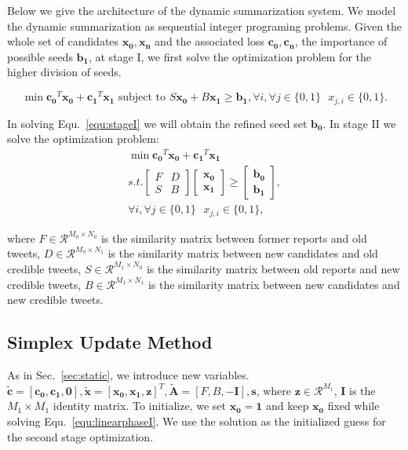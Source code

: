 \documentclass[envcountsame]{llncs}
\begin{document}
Below we give the architecture of the dynamic summarization system. We model the dynamic summarization as sequential integer programing problems.  Given the whole set of candidates $\mathbf{x_0,x_n}$ and the associated loss $\mathbf{c_0,c_n}$, the importance of possible seeds $\mathbf{b_1}$, at stage I, we first solve the optimization problem for the higher division of seeds. 

\begin{equation}\label{equ:stageI}
\min \mathbf{c_0}^T \mathbf{x_0} + \mathbf{c_1}^T \mathbf{x_1} \textrm{ subject to } S \mathbf{x_0} + B\mathbf{x_1} \geq \mathbf{b_1}, \forall i, \forall j\in \{0,1\}\textrm{ } x_{j,i}\in \{0,1\}.
\end{equation}

In solving Equ.~\ref{equ:stageI} we will obtain the refined seed set $\mathbf{b_0}$. In stage II we solve the optimization problem:
\begin{eqnarray}
\min \mathbf{c_0}^T \mathbf{x_0}+\mathbf{c_1}^T\mathbf{x_1}\\\nonumber
s.t. \begin{bmatrix}
F & D \\
S & B
\end{bmatrix}\begin{bmatrix}
 \mathbf{x_0}\\
\mathbf{x_1}
\end{bmatrix}\geq \begin{bmatrix}
\mathbf{b_0}\\
\mathbf{b_1}
\end{bmatrix},\\\nonumber
 \forall i, \forall j\in \{0,1\}\textrm{ } x_{j,i}\in \{0,1\}, 
\end{eqnarray}

where $F\in \mathcal{R}^{M_0\times N_0}$ is the similarity matrix between former reports and old tweets, $D\in \mathcal{R}^{M_0\times N_1}$ is the similarity matrix between new candidates and old credible tweets, $S\in \mathcal{R}^{M_1\times N_0}$ is the similarity matrix between old reports and new credible tweets, $B\in \mathcal{R}^{M_1 \times N_1}$ is the similarity matrix between new candidates and new credible tweets.

\subsection{Simplex Update Method}

As in Sec.~\ref{sec:static}, we introduce new variables.  $\tilde{\mathbf{c}}=[\mathbf{c_0},\mathbf{c_1}, \mathbf{0}],\tilde{\mathbf{x}}=[\mathbf{x_0},\mathbf{x_1},\mathbf{z}]^T,\tilde{\mathbf{A}}=[F,B,-\mathbf{I}],\mathbf{s}$, where $\mathbf{z}\in\mathcal{R}^{M_1}$, $ \mathbf{I}$ is the $M_1\times M_1$ identity matrix. To initialize, we set  $\mathbf{x_0}=\mathbf{1}$ and keep $\mathbf{x_0}$ fixed while solving Equ.~\ref{equ:linearphaseI}. We use the solution as the initialized guess for the second stage optimization. 
\end{document}

